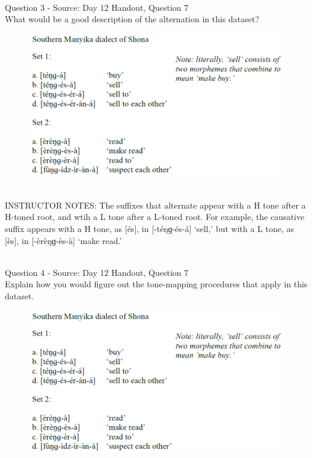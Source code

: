 \documentclass[12pt]{article}
\begin{document}
~\\

{\large Question 3} - Source: Day 12 Handout, Question 7\\

What would be a good description of the alternation in this dataset?\\

\begin{figure}[H]
\includegraphics{../images/shona.png}
\end{figure}

~\\
INSTRUCTOR NOTES: The suffixes that alternate appear with a H tone after a H-toned root, and wtih a L tone after a L-toned root. For example, the causative suffix appears with a H tone, as [és], in [-téŋɡ-és-á] ‘sell,’ but with a L tone, as [ès], in [-èrèŋɡ-ès-à] ‘make read.’


~\\

{\large Question 4} - Source: Day 12 Handout, Question 7\\

Explain how you would figure out the tone-mapping procedures that apply in this dataset.\\

\begin{figure}[H]
\includegraphics{../images/shona.png}
\end{figure}
\end{document}
